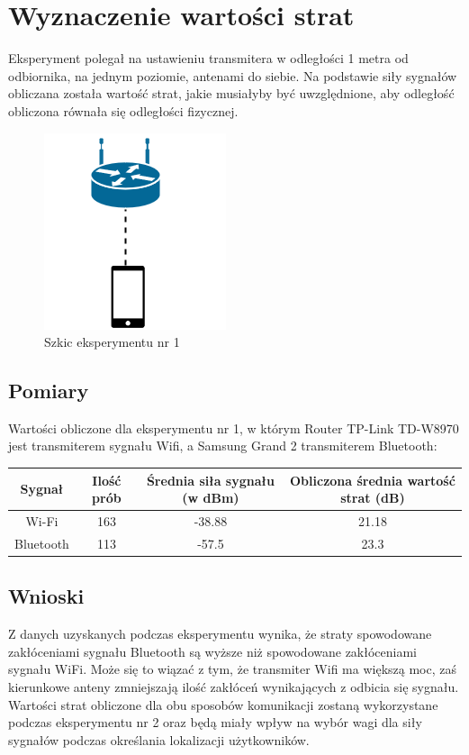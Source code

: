 \section{Wyznaczenie wartości strat}
Eksperyment polegał na ustawieniu transmitera w odległości 1 metra od odbiornika, na jednym poziomie, antenami do siebie. Na podstawie siły sygnałów obliczana została wartość strat, jakie musiałyby być uwzględnione, aby odległość obliczona równała się odległości fizycznej.\\			
\begin{figure}[H]
	\centering			
	\caption{Szkic eksperymentu nr 1}
	\includegraphics{exper1}
\end{figure}
\subsection{Pomiary}
	Wartości obliczone dla eksperymentu nr 1, w którym Router TP-Link TD-W8970 jest transmiterem sygnału Wifi, a Samsung Grand 2 transmiterem Bluetooth:
	\begin{center}
		\begin{minipage}{\linewidth}
			\begin{tabular}{|c|c|c|c|}
				\hline 
				Sygnał & Ilość prób & Średnia siła sygnału (w dBm) & Obliczona średnia wartość strat (dB) \\ 
				\hline 
				Wi-Fi & 163 & -38.88 & 21.18 \\ 
				\hline 
				Bluetooth & 113 & -57.5 & 23.3 \\ 
				\hline 
			\end{tabular} 
		\end{minipage} 
	\end{center}
\subsection{Wnioski}
Z danych uzyskanych podczas eksperymentu wynika, że straty spowodowane zakłóceniami sygnału Bluetooth są wyższe niż spowodowane zakłóceniami sygnału WiFi. Może się to wiązać z tym, że transmiter Wifi ma większą moc, zaś kierunkowe anteny zmniejszają ilość zakłóceń wynikających z odbicia się sygnału. Wartości strat obliczone dla obu sposobów komunikacji zostaną wykorzystane podczas eksperymentu nr 2 oraz będą miały wpływ na wybór wagi dla siły sygnałów podczas określania lokalizacji użytkowników.
